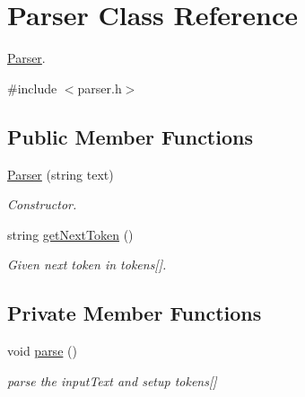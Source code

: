\hypertarget{classParser}{}\section{Parser Class Reference}
\label{classParser}


\hyperlink{classParser}{Parser}.  




{\ttfamily \#include $<$parser.\+h$>$}

\subsection*{Public Member Functions}
\begin{DoxyCompactItemize}
\item 
\hyperlink{classParser_aab24c7b1f845c389cf8a5ce4a33113bf}{Parser} (string text)
\begin{DoxyCompactList}\small\item\em Constructor. \end{DoxyCompactList}\item 
string \hyperlink{classParser_a8c9e6b23d2c4ab80652dc7f65f44404e}{get\+Next\+Token} ()
\begin{DoxyCompactList}\small\item\em Given next token in tokens\mbox{[}\mbox{]}. \end{DoxyCompactList}\end{DoxyCompactItemize}
\subsection*{Private Member Functions}
\begin{DoxyCompactItemize}
\item 
void \hyperlink{classParser_ad941a297e9f6abb39271090806a6be33}{parse} ()\hypertarget{classParser_ad941a297e9f6abb39271090806a6be33}{}\label{classParser_ad941a297e9f6abb39271090806a6be33}

\begin{DoxyCompactList}\small\item\em parse the input\+Text and setup tokens\mbox{[}\mbox{]} \end{DoxyCompactList}\end{DoxyCompactItemize}
